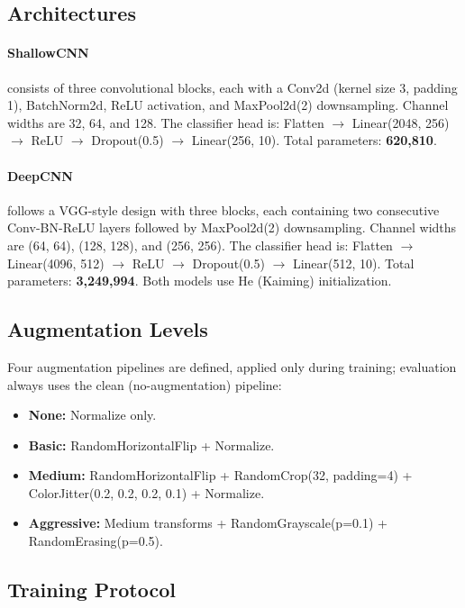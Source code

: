 \documentclass[11pt,letterpaper]{article}
\begin{document}
\subsection{Architectures}

\paragraph{ShallowCNN} consists of three convolutional blocks, each with a Conv2d (kernel
size 3, padding 1), BatchNorm2d, ReLU activation, and MaxPool2d(2) downsampling. Channel
widths are 32, 64, and 128. The classifier head is: Flatten $\to$ Linear(2048, 256) $\to$
ReLU $\to$ Dropout(0.5) $\to$ Linear(256, 10). Total parameters: \textbf{620,810}.

\paragraph{DeepCNN} follows a VGG-style design \cite{simonyanvery} with three blocks, each
containing two consecutive Conv-BN-ReLU layers followed by MaxPool2d(2) downsampling. Channel
widths are (64, 64), (128, 128), and (256, 256). The classifier head is: Flatten $\to$
Linear(4096, 512) $\to$ ReLU $\to$ Dropout(0.5) $\to$ Linear(512, 10). Total parameters:
\textbf{3,249,994}. Both models use He (Kaiming) initialization.

\subsection{Augmentation Levels}

Four augmentation pipelines are defined, applied only during training; evaluation always uses
the clean (no-augmentation) pipeline:

\begin{itemize}[noitemsep]
  \item \textbf{None:} Normalize only.
  \item \textbf{Basic:} RandomHorizontalFlip + Normalize.
  \item \textbf{Medium:} RandomHorizontalFlip + RandomCrop(32, padding=4) +
        ColorJitter(0.2, 0.2, 0.2, 0.1) + Normalize.
  \item \textbf{Aggressive:} Medium transforms + RandomGrayscale(p=0.1) +
        RandomErasing(p=0.5).
\end{itemize}

\subsection{Training Protocol}
\end{document}
